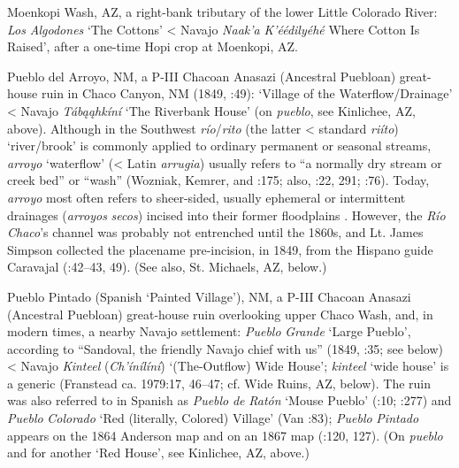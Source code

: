 Moenkopi Wash, AZ, a right-bank tributary of the lower Little Colorado River: \textit{Los} \textit{Algodones} ‘The Cottons’ < Navajo \textit{Naak’a} \textit{K’éédilyéhé} Where Cotton Is Raised’, after a one-time Hopi crop at Moenkopi, AZ.

Pueblo del Arroyo, NM, a P-III Chacoan Anasazi (Ancestral Puebloan) great-house ruin in Chaco Canyon, NM (1849, \citealt{McNitt1964}:49):  ‘Village of the Waterflow/Drainage’ < Navajo \textit{Tábąąhkíní} ‘The Riverbank House’ (on \textit{pueblo}, see Kinlichee, AZ, above).  Although in the Southwest \textit{río}/\textit{rito} (the latter < standard \textit{riíto}) ‘river/brook’ is commonly applied to ordinary permanent or seasonal streams, \textit{arroyo} ‘waterflow’ (< Latin \textit{arrugia}) usually refers to “a normally dry stream or creek bed” or “wash” (Wozniak, Kemrer, and \citealt{Carillo1992}:175; also, \citealt{Julyan1998}:22, 291; \citealt{Studerus2001}:76).  Today, \textit{arroyo} most often refers to sheer-sided, usually ephemeral or intermittent drainages (\textit{arroyos} \textit{secos}) incised into their former floodplains \citep[221]{Pearce1932}.  However, the \textit{Río} \textit{Chaco}’s channel was probably not entrenched until the 1860s, and Lt. James Simpson collected the placename pre-incision, in 1849, from the Hispano guide Caravajal (\citealt{McNitt1964}:42–43, 49).  (See also, St. Michaels, AZ, below.)

Pueblo Pintado (Spanish ‘Painted Village’), NM, a P-III Chacoan Anasazi (Ancestral Puebloan) great-house ruin overlooking upper Chaco Wash, and, in modern times, a nearby Navajo settlement:  \textit{Pueblo} \textit{Grande} ‘Large Pueblo’, according to “Sandoval, the friendly Navajo chief with us” (1849, \citealt{McNitt1964}:35; see below) < Navajo \textit{Kinteel} (\textit{Ch’ínílíní}) ‘(The-Outflow) Wide House’; \textit{kinteel} ‘wide house’ is a generic (Franstead ca. 1979:17, 46–47; cf. Wide Ruins, AZ, below).  The ruin was also referred to in Spanish as \textit{Pueblo} \textit{de} \textit{Ratón} ‘Mouse Pueblo’ (\citealt{Brugge1980}:10; \citealt{Julyan1998}:277) and \textit{Pueblo} \textit{Colorado} ‘Red  (literally, Colored) Village’ (Van \citealt{Valkenburgh1999}:83); \textit{Pueblo} \textit{Pintado} appears on the 1864 Anderson map and on an 1867 map (\citealt{Eidenbach2012}:120, 127).  (On \textit{pueblo} and for another ‘Red House’, see Kinlichee, AZ, above.)

